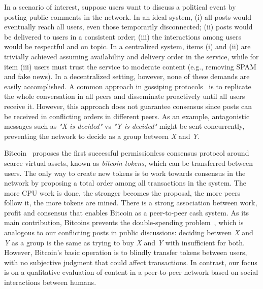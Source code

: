 \documentclass[10pt,journal,compsoc]{IEEEtran}
\begin{document}
In a scenario of interest, suppose users want to discuss a political event by
posting public comments in the network.
In an ideal system,
(i)   all posts would eventually reach all users, even those temporarily
      disconnected;
(ii)  posts would be delivered to users in a consistent order;
(iii) the interactions among users would be respectful and on topic.
In a centralized system, items (i) and (ii) are trivially achieved assuming
availability and delivery order in the service, while for item (iii) users must
trust the service to moderate content (e.g., removing SPAM and fake news).
In a decentralized setting, however, none of these demands are easily
accomplished.
A common approach in gossiping protocols~\cite{p2p.survey} is to replicate the
whole conversation in all peers and disseminate proactively until all users
receive it.
However, this approach does not guarantee consensus since posts can be received
in conflicting orders in different peers.
As an example, antagonistic messages such as \emph{"X is decided"} vs
\emph{"Y is decided"} might be sent concurrently, preventing the network to
decide as a group between \emph{X} and \emph{Y}.

Bitcoin~\cite{p2p.bitcoin} proposes the first successful permissionless
consensus protocol around scarce virtual assets, known as
\emph{bitcoin tokens}, which can be transferred between users.
%
The only way to create new tokens is to work towards consensus in the network
by proposing a total order among all transactions in the system.
The more CPU work is done, the stronger becomes the proposal, the more peers
follow it, the more tokens are mined.
There is a strong association between work, profit and consensus that enables
Bitcoin as a peer-to-peer cash system.
%
As its main contribution, Bitcoins prevents the double-spending
problem~\cite{p2p.bitcoin}, which is analogous to our conflicting posts in
public discussions: deciding between \emph{X} and \emph{Y} as a group is the
same as trying to buy \emph{X} and \emph{Y} with insufficient for both.
%
However, Bitcoin's basic operation is to blindly transfer tokens between users,
with no subjective judgment that could affect transactions.
In contrast, our focus is on a qualitative evaluation of content in a
peer-to-peer network based on social interactions between humans.
\end{document}
